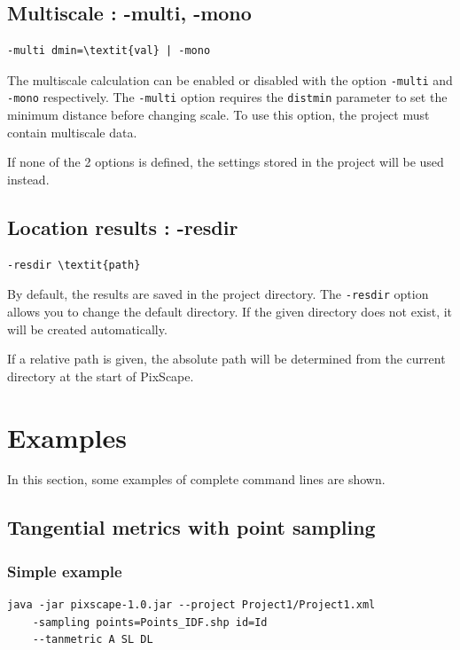 \documentclass{report}
\begin{document}
\subsection{Multiscale : -multi, -mono}
\begin{Verbatim}[commandchars=\\\{\}]
-multi dmin=\textit{val} | -mono
\end{Verbatim}

The multiscale calculation can be enabled or disabled with the option \verb|-multi| and \verb|-mono| respectively.
The \verb|-multi| option requires the \verb|distmin| parameter to set the minimum distance before changing scale. To use this option, the project must contain multiscale data.

If none of the 2 options is defined, the settings stored in the project will be used instead.

\subsection{Location results : -resdir}
\begin{Verbatim}[commandchars=\\\{\}]
-resdir \textit{path}
\end{Verbatim}
By default, the results are saved in the project directory. The \verb|-resdir| option allows you to change the default directory.
If the given directory does not exist, it will be created automatically.

If a relative path is given, the absolute path will be determined from the current directory at the start of PixScape.


\section{Examples}

In this section, some examples of complete command lines are shown.

\subsection{Tangential metrics with point sampling}
\subsubsection{Simple example}
\begin{Verbatim}
java -jar pixscape-1.0.jar --project Project1/Project1.xml 
	-sampling points=Points_IDF.shp id=Id 
	--tanmetric A SL DL
\end{Verbatim}
\end{document}

